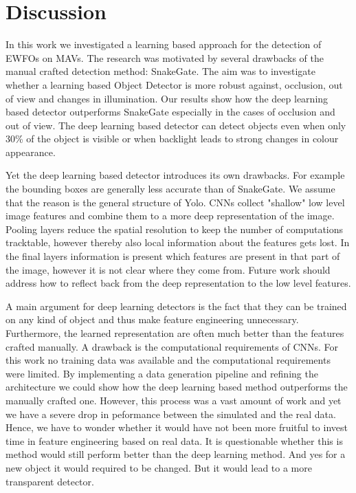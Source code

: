 \chapter{Discussion}

In this work we investigated a learning based approach for the detection of \acp{EWFO} on \acp{MAV}. The research was motivated by several drawbacks of the manual crafted detection method: SnakeGate. The aim was to investigate whether a learning based Object Detector is more robust against, occlusion, out of view and changes in illumination. Our results show how the deep learning based detector outperforms SnakeGate especially in the cases of occlusion and out of view. The deep learning based detector can detect objects even when only 30\% of the object is visible or when backlight leads to strong changes in colour appearance.

Yet the deep learning based detector introduces its own drawbacks. For example the bounding boxes are generally less accurate than of SnakeGate. We assume that the reason is the general structure of \ac{Yolo}. \acp{CNN} collect "shallow" low level image features and combine them to a more deep representation of the image. Pooling layers reduce the spatial resolution to keep the number of computations tracktable, however thereby also local information about the features gets lost. In the final layers information is present which features are present in that part of the image, however it is not clear where they come from. Future work should address how to reflect back from the deep representation to the low level features.

A main argument for deep learning detectors is the fact that they can be trained on any kind of object and thus make feature engineering unnecessary. Furthermore, the learned representation are often much better than the features crafted manually. A drawback is the computational requirements of \acp{CNN}. For this work no training data was available and the computational requirements were limited. By implementing a data generation pipeline and refining the architecture we could show how the deep learning based method outperforms the manually crafted one. However, this process was a vast amount of work and yet we have a severe drop in peformance between the simulated and the real data. Hence, we have to wonder whether it would have not been more fruitful to invest time in feature engineering based on real data. It is questionable whether this is method would still perform better than the deep learning method. And yes for a new object it would required to be changed. But it would lead to a more transparent detector.
